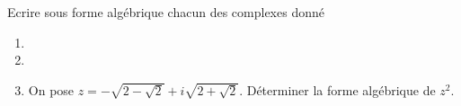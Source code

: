 \begin{exercice}
Ecrire sous forme alg\'ebrique chacun des complexes donn\'e
  \begin{enumerate}
  \item {}
  \item

  \item On pose $z=-\sqrt{2-\sqrt2}+i\sqrt{2+\sqrt2}$. D\'eterminer la
  forme alg\'ebrique de $z^2$.
  \end{enumerate}
\end{exercice}
